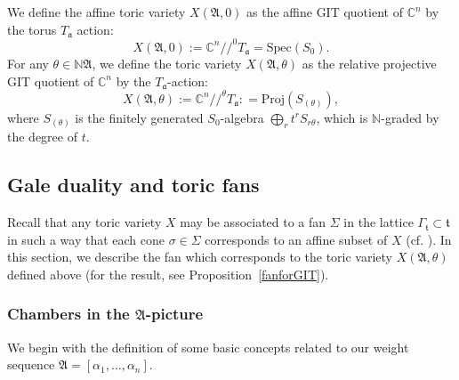 \documentclass[11pt]{article}
\theoremstyle{definition}
\numberwithin{equation}{section}
\newcommand{\A}{\mathfrak{A}}
\newcommand{\sslash}{\!/\!/}
\begin{document}
We define the affine toric variety $X(\A,0)$ as the affine GIT quotient of $\mathbb{C}^n$ by the torus $T_{\mathfrak{a}}$ action:
$$ X(\A,0) := \mathbb{C}^n\sslash^0 T_{\mathfrak{a}}  = 
\mathrm{Spec}(S_0).$$   \label{X_0def}
For any $\theta \in \mathbb{N}\A$, we define the toric variety $X(\A,\theta)$ as the relative projective GIT quotient of $\mathbb{C}^n$ by the  $T_{\mathfrak{a}}$-action:
$$X(\A,\theta) := \mathbb{C}^n\sslash^\theta{T_{\mathfrak{a}}} : = \mathrm{Proj}(S_{(\theta)}),$$
where $S_{(\theta)}$ is the finitely generated $S_0$-algebra $\bigoplus_r t^r S_{r\theta}$, which is $\mathbb{N}$-graded by the degree of $t$.

\subsection{Gale duality and toric fans}\label{S2.2} 
Recall that any toric variety $X$ may be associated to a fan $\Sigma$ in the 
lattice $\Gamma_\mathfrak{t}\subset\mathfrak{t}$ in such a way that each cone 
$\sigma\in\Sigma$ corresponds to an affine subset of  $X$ (cf.  
\cite[\S1.4]{Fulton}). 
In this section, we describe the fan which corresponds to the toric variety 
$X(\A,\theta)$ defined above (for the result, see Proposition~\ref{fanforGIT}). 


\subsubsection{Chambers in the \texorpdfstring{$\A$}{A}-picture}
We begin with the definition of some basic concepts related to our weight 
sequence $\A=[\alpha_1, \ldots,\alpha_n]$.
\end{document}
